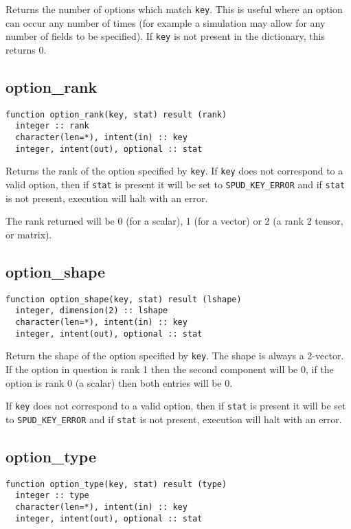 \documentclass[a4paper, 11pt]{book}
\begin{document}
Returns the number of options which match \lstinline+key+. This is
useful where an option can occur any number of times (for example a
simulation may allow for any number of fields to be specified). If
\lstinline+key+ is not present in the dictionary, this returns 0.

\subsection{option\_rank}

\begin{lstlisting}
function option_rank(key, stat) result (rank)
  integer :: rank
  character(len=*), intent(in) :: key
  integer, intent(out), optional :: stat
\end{lstlisting}

Returns the rank of the option specified by \lstinline+key+. If
\lstinline+key+ does not correspond to a valid option, then if
\lstinline+stat+ is present it will be set to \lstinline+SPUD_KEY_ERROR+ and
if \lstinline+stat+ is not present, execution will halt with an error.

The rank returned will be 0 (for a scalar), 1 (for a vector) or 2 (a rank 2
tensor, or matrix). 

\subsection{option\_shape}

\begin{lstlisting}
function option_shape(key, stat) result (lshape)
  integer, dimension(2) :: lshape
  character(len=*), intent(in) :: key
  integer, intent(out), optional :: stat
\end{lstlisting}

Return the shape of the option specified by \lstinline+key+. The shape is
always a 2-vector. If the option in question is rank 1 then the second
component will be 0, if the option is rank 0 (a scalar) then both entries
will be 0.

 If \lstinline+key+ does not correspond to a valid option, then if
 \lstinline+stat+ is present it will be set to \lstinline+SPUD_KEY_ERROR+ and
 if \lstinline+stat+ is not present, execution will halt with an error.

\subsection{option\_type}

\begin{lstlisting}
function option_type(key, stat) result (type)
  integer :: type
  character(len=*), intent(in) :: key
  integer, intent(out), optional :: stat
\end{lstlisting}
\end{document}
